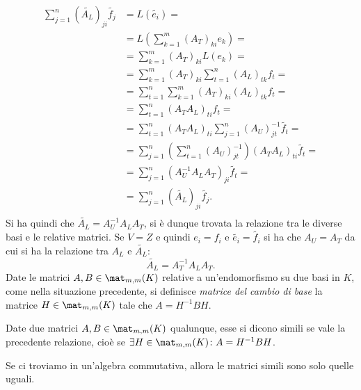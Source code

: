 \begin{equation*}
	\begin{split}
		 \sum_{j=1}^n(\tilde{A_L})_{ji}\tilde{f_j} & = L(\tilde{e_i}) =\\
		 &= L(\sum_{k=1}^m(A_T)_{ki}e_k) =\\
		 & = \sum_{k=1}^m(A_T)_{ki}L(e_k) =\\
		 &= \sum_{k=1}^m(A_T)_{ki} \sum_{t=1}^n(A_L)_{tk}f_t = \\
		 & =\sum_{t=1}^n \sum_{k=1}^m(A_T)_{ki} (A_L)_{tk}f_t = \\
		 & = \sum_{t=1}^n (A_T A_L)_{ti}f_t = \\
		 & = \sum_{t=1}^n (A_T A_L)_{ti} \sum_{j=1}^n(A_U)_{jt}^{-1}\tilde{f_t} = \\
		 & = \sum_{j=1}^n( \sum_{t=1}^n(A_U)_{jt}^{-1})(A_T A_L)_{ti}\tilde{f_t} = \\
		 & = \sum_{j=1}^n (A_U^{-1} A_L A_T)_{ji}\tilde{f_t} = \\
		 & = \sum_{j=1}^n(\tilde{A_L})_{ji}\tilde{f_j}.\\
	 \end{split}
 \end{equation*}
Si ha quindi che $\tilde{A_L} = A_U^{-1} A_L A_T$, si è dunque trovata la relazione tra le diverse basi e le relative matrici.
Se $V=Z$ e quindi $e_i=f_i$ e $\tilde{e_i}=\tilde{f_i}$ si ha che $A_U = A_T$ da cui si ha la relazione tra $A_L$ e $\tilde{A_L}$:
\begin{equation*}
	\tilde{A_L} = A_T^{-1} A_L A_T.
\end{equation*}
Date le matrici $A,B\in\mat_{m,m}(K)$ relative a un'endomorfismo su due basi in $K$, come nella situazione precedente, si definisce \emph{matrice del cambio di base} la matrice $H\in\mat_{m,m}(K)$ tale che $A = H^{-1}BH$.
\begin{definizione}
Date due matrici $A,B\in\mat_{m,m}(K)$ qualunque, esse si dicono simili se vale la precedente relazione, cioè se $\exists H\in\mat_{m,m}(K)\colon A = H^{-1}BH$.
\end{definizione}
Se ci troviamo in un'algebra commutativa, allora le matrici simili sono solo quelle uguali.

